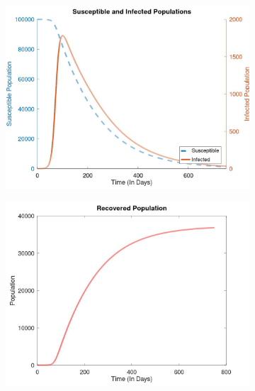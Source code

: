 \documentclass [letterpaper, 12pt] {article}
\begin{document}
\begin{figure}[h!]
	\begin{subfigure}{0.48\textwidth}
	\includegraphics[width=\linewidth]{Figures/bubonic750.jpg}
	\end{subfigure}\hspace{\fill}
	\begin{subfigure}{0.48\textwidth}
	\includegraphics[width=\linewidth]{Figures/bubonicr.jpg}
	\end{subfigure}
	\begin{subfigure}{0.48\textwidth}

\end{subfigure}
\end{figure}
\end{document}
